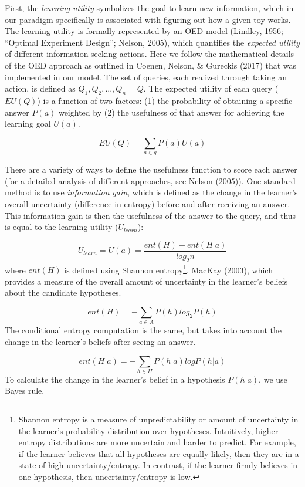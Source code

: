 \documentclass[10pt, letterpaper]{article}
\begin{document}
First, the \emph{learning utility} symbolizes the goal to learn new
information, which in our paradigm specifically is associated with
figuring out how a given toy works. The learning utility is formally
represented by an OED model (Lindley, 1956; ``Optimal Experiment
Design''; Nelson, 2005), which quantifies the \emph{expected utility} of
different information seeking actions. Here we follow the mathematical
details of the OED approach as outlined in Coenen, Nelson, \& Gureckis
(2017) that was implemented in our model. The set of queries, each
realized through taking an action, is defined as
\(Q_1, Q_2, ..., Q_n = {Q}\). The expected utility of each query
(\(EU(Q)\)) is a function of two factors: (1) the probability of
obtaining a specific answer \(P(a)\) weighted by (2) the usefulness of
that answer for achieving the learning goal \(U(a)\).

\[EU(Q) = \sum_{a\in q}{P(a)U(a)}\]

There are a variety of ways to define the usefulness function to score
each answer (for a detailed analysis of different approaches, see Nelson
(2005)). One standard method is to use \emph{information gain}, which is
defined as the change in the learner's overall uncertainty (difference
in entropy) before and after receiving an answer. This information gain
is then the usefulness of the answer to the query, and thus is equal to
the learning utility (\(U_{learn}\)):

\[ U_{learn} = U(a) = \frac{ent(H) - ent(H|a)}{log_2n}\] \noindent
where \(ent(H)\) is defined using Shannon
entropy\footnote{Shannon entropy is a measure of unpredictability or amount of uncertainty in the learner's probability distribution over hypotheses. Intuitively, higher entropy distributions are more uncertain and harder to predict. For example, if the learner believes that all hypotheses are equally likely, then they are in a state of high uncertainty/entropy. In contrast, if the learner firmly believes in one hypothesis, then uncertainty/entropy is low.}.
MacKay (2003), which provides a measure of the overall amount of
uncertainty in the learner's beliefs about the candidate hypotheses.

\[ent(H) = -\sum_{a\in A}{P(h)log_2P(h)}\] \noindent
The conditional entropy computation is the same, but takes into account
the change in the learner's beliefs after seeing an answer.

\[ ent(H|a) = -\sum_{h\in H}{P(h|a)logP(h|a)} \] \noindent
To calculate the change in the learner's belief in a hypothesis
\(P(h|a)\), we use Bayes rule.
\end{document}
